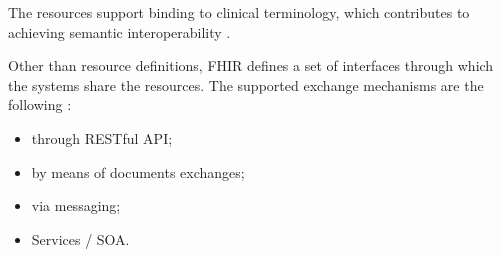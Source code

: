 The resources support binding to clinical terminology, which contributes to achieving semantic interoperability \cite{FHIRArchitecture}.

Other than resource definitions, FHIR defines a set of interfaces through which the systems share the resources. The supported exchange mechanisms are the following \cite{FHIRClinician}:
\begin{itemize}
  \item through RESTful API;
  \item by means of documents exchanges;
  \item via messaging;
  \item Services / SOA.
\end{itemize}

